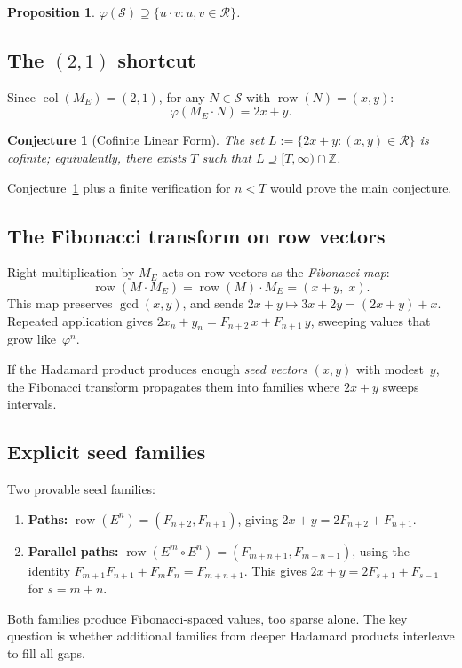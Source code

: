 \documentclass[11pt,a4paper]{article}
\newtheorem{conjecture}[theorem]{Conjecture}
\newtheorem{proposition}[theorem]{Proposition}
\theoremstyle{definition}
\theoremstyle{remark}
\newcommand{\ZZ}{\mathbb{Z}}
\newcommand{\cS}{\mathcal{S}}
\newcommand{\cR}{\mathcal{R}}
\newcommand{\row}{\operatorname{row}}
\newcommand{\col}{\operatorname{col}}
\begin{document}
\begin{proposition}
$\varphi(\cS) \supseteq \{u \cdot v : u, v \in \cR\}$.
\end{proposition}

\subsection{The $(2, 1)$ shortcut}

Since $\col(M_E) = (2, 1)$, for any $N \in \cS$ with $\row(N) = (x, y)$:
\[
\varphi(M_E \cdot N) = 2x + y.
\]

\begin{conjecture}[Cofinite Linear Form]
\label{conj:clf}
The set $L := \{2x + y : (x, y) \in \cR\}$ is cofinite; equivalently, there exists $T$ such that $L \supseteq [T, \infty) \cap \ZZ$.
\end{conjecture}

Conjecture~\ref{conj:clf} plus a finite verification for $n < T$ would prove the main conjecture.

\subsection{The Fibonacci transform on row vectors}

Right-multiplication by $M_E$ acts on row vectors as the \emph{Fibonacci map}:
\[
\row(M \cdot M_E) = \row(M) \cdot M_E = (x + y,\; x).
\]
This map preserves $\gcd(x, y)$, and sends $2x + y \mapsto 3x + 2y = (2x+y) + x$. Repeated application gives $2x_n + y_n = F_{n+2}\, x + F_{n+1}\, y$, sweeping values that grow like~$\varphi^n$.

If the Hadamard product produces enough \emph{seed vectors} $(x, y)$ with modest~$y$, the Fibonacci transform propagates them into families where $2x + y$ sweeps intervals.

\subsection{Explicit seed families}

Two provable seed families:
\begin{enumerate}
  \item \textbf{Paths:} $\row(E^n) = (F_{n+2}, F_{n+1})$, giving $2x + y = 2F_{n+2} + F_{n+1}$.
  \item \textbf{Parallel paths:} $\row(E^m \circ E^n) = (F_{m+n+1}, F_{m+n-1})$, using the identity $F_{m+1}F_{n+1} + F_m F_n = F_{m+n+1}$. This gives $2x + y = 2F_{s+1} + F_{s-1}$ for $s = m + n$.
\end{enumerate}
Both families produce Fibonacci-spaced values, too sparse alone. The key question is whether additional families from deeper Hadamard products interleave to fill all gaps.
\end{document}
